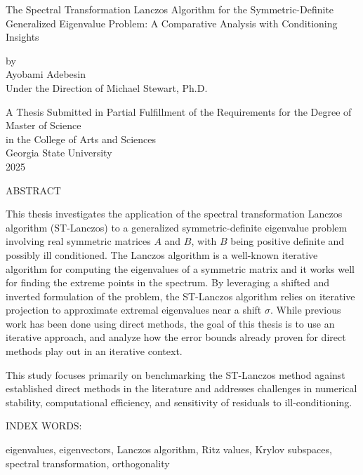 \pagestyle{empty}
\begin{center}
The Spectral Transformation Lanczos Algorithm for the Symmetric-Definite Generalized Eigenvalue Problem: A Comparative Analysis with Conditioning Insights

\vspace{.9in}
by\\
\vspace{.9in}
Ayobami Adebesin\\
\vspace{.9in}
Under the Direction of Michael Stewart, Ph.D. \\
\vspace{2in}

A Thesis Submitted in Partial Fulfillment of the Requirements for the Degree of\\  %
\vspace{.2in}
Master of Science \\
\vspace{.2in}
in the College of Arts and Sciences \\
\vspace{.2in}
Georgia State University \\
\vspace{.2in}
2025
\pagebreak 



ABSTRACT\\
\bigskip
\end{center}

\begin{flushleft}
	\justify
	This thesis investigates the application of the spectral transformation Lanczos algorithm (ST-Lanczos) to a generalized symmetric-definite eigenvalue problem involving real symmetric matrices $A$ and $B$, with $B$ being positive definite and possibly ill conditioned. The Lanczos algorithm is a well-known iterative algorithm for computing the eigenvalues of a symmetric matrix and it works well for finding the extreme points in the spectrum. By leveraging a shifted and inverted formulation of the problem, the ST-Lanczos algorithm relies on iterative projection to approximate extremal eigenvalues near a shift $\sigma$. While previous work has been done using direct methods, the goal of this thesis is to use an iterative approach, and analyze how the error bounds already proven for direct methods play out in an iterative context.

    This study focuses primarily on benchmarking the ST-Lanczos method against established direct methods in the literature and addresses challenges in numerical stability, computational efficiency, and sensitivity of residuals to ill-conditioning.
\end{flushleft} 
\begin{singlespace}
\vspace{0.5in}
\noindent INDEX WORDS:
\hspace{0.2in}
\parbox[t]{4.5in}{
  eigenvalues, eigenvectors, Lanczos algorithm, Ritz values, Krylov subspaces, spectral transformation, orthogonality}
\end{singlespace} 
